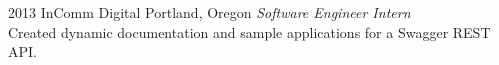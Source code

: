 \documentclass[]{friggeri-cv} %
\begin{document}
\begin{entrylist}

%
%

\entry
{2013}
{InComm Digital}
{Portland, Oregon}
{\emph{Software Engineer Intern}
\smallskip
  \\
Created dynamic documentation and sample applications for a Swagger REST API.}


\end{entrylist}

\end{document}
